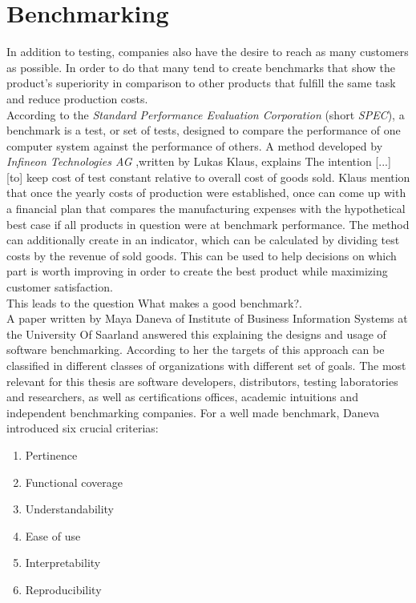 \section{Benchmarking}
In addition to testing, companies also have the desire to reach as many customers as possible. In order to do that many tend to create benchmarks that show the product's superiority in comparison to other products that fulfill the same task and reduce production costs.\\
According to the \textit{Standard Performance Evaluation Corporation} (short \textit{SPEC}), a benchmark is a \dq test, or set of tests, designed to compare the performance of one computer system against the performance of others\dq{}\cite{spec-benchmark}. A method developed by \textit{Infineon Technologies AG} ,written by Lukas Klaus, explains \dq The intention [...] [to] keep cost of test constant relative to overall cost of goods sold\dq{}. Klaus mention that once the yearly costs of production were established, once can come up with a financial plan that compares the manufacturing expenses with the \dq hypothetical best case if all products in question were at benchmark performance\dq{}. The method can additionally create in an indicator, which can be calculated by dividing test costs by the revenue of sold goods\cite{4221595}. This can be used to help decisions on which part is worth improving in order to create the best product while maximizing customer satisfaction.\\  
This leads to the question \dq What makes a good benchmark?\dq{}.\\
A paper written by Maya Daneva of Institute of Business Information Systems at the University Of Saarland answered this explaining the designs and usage of software benchmarking. According to her the targets of this approach can be classified in different classes of organizations with different set of goals. The most relevant for this thesis are software developers, distributors, testing laboratories and researchers, as well as certifications offices, academic intuitions and independent benchmarking companies. For a well made benchmark, Daneva introduced six crucial criterias\cite{Daneva1995}:
\begin{enumerate}
	\item Pertinence 
	\item Functional coverage   
	\item Understandability 
	\item Ease of use  
	\item Interpretability
	\item Reproducibility
\end{enumerate}    
